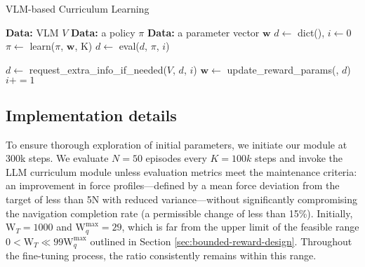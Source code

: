 \begin{algorithm}
\caption{VLM-based Curriculum Learning}
\label{algo:vlm-curriculum}
\begin{algorithmic}[1]
\State \textbf{Data:} VLM $V$
\State \textbf{Data:} a  policy $\pi$
\State \textbf{Data:} a  parameter vector $\mathbf{w}$
\State $d \gets$ dict(), $i \gets 0$
    \State $\pi \gets$ learn($\pi$, $\mathbf{w}$, K) 
    \State $d \gets$ eval($d$, $\pi$, $i$) 

        \State $d \gets$ request\_extra\_info\_if\_needed($V$, $d$, $i$)
        \State $\mathbf{w} \gets$ update\_reward\_params(, $d$)
    \EndIf
    \State $i += 1$
\EndWhile
\end{algorithmic}
\end{algorithm}
\vspace{-1.5em}





























\subsection{Implementation details}

 To ensure thorough exploration of initial parameters, we initiate our module at 300k steps. We evaluate $N=50$ episodes every $K=100k$ steps and invoke the LLM curriculum module unless evaluation metrics meet the maintenance criteria: an improvement in force profiles—defined by a mean force deviation from the target of less than 5N with reduced variance—without significantly compromising the navigation completion rate (a permissible change of less than 15\%). Initially, $\text{W}_T = 1000$ and $\text{W}_q^{\text{max}} = 29$, which is far from the upper limit of the feasible range $0 < \text{W}_T \ll 99\text{W}_q^{\text{max}}$ outlined in Section \ref{sec:bounded-reward-design}.  Throughout the fine-tuning process, the ratio consistently remains within this range.
